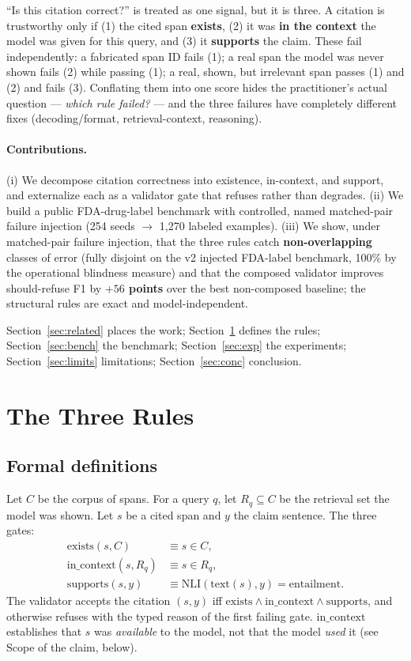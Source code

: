 ``Is this citation correct?'' is treated as one signal, but it is
three. A citation is trustworthy only if (1) the cited span
\textbf{exists}, (2) it was \textbf{in the context} the model was
given for this query, and (3) it \textbf{supports} the claim. These
fail independently: a fabricated span ID fails (1); a real span the
model was never shown fails (2) while passing (1); a real, shown, but
irrelevant span passes (1) and (2) and fails (3). Conflating them into
one score hides the practitioner's actual question --- \emph{which
rule failed?} --- and the three failures have completely different
fixes (decoding/format, retrieval-context, reasoning).

\paragraph{Contributions.}
(i) We decompose citation correctness into existence, in-context, and
support, and externalize each as a validator gate that refuses rather
than degrades. (ii) We build a public FDA-drug-label benchmark with
controlled, named matched-pair failure injection (254 seeds $\to$
1{,}270 labeled examples). (iii) We show, under matched-pair failure
injection, that the three rules catch \textbf{non-overlapping} classes
of error (fully disjoint on the v2 injected FDA-label benchmark, 100\%
by the operational blindness measure) and that the composed validator
improves should-refuse F1 by \textbf{$+56$ points} over the best
non-composed baseline; the structural rules are exact and
model-independent.

Section~\ref{sec:related} places the work; Section~\ref{sec:rules}
defines the rules; Section~\ref{sec:bench} the benchmark;
Section~\ref{sec:exp} the experiments; Section~\ref{sec:limits}
limitations; Section~\ref{sec:conc} conclusion.



\section{The Three Rules}
\label{sec:rules}

\subsection{Formal definitions}
\label{sec:rules-formal}

Let $C$ be the corpus of spans. For a query $q$, let $R_q \subseteq C$
be the retrieval set the model was shown. Let $s$ be a cited span and
$y$ the claim sentence. The three gates:
\begin{align*}
  \mathrm{exists}(s, C) &\equiv s \in C, \\
  \mathrm{in\_context}(s, R_q) &\equiv s \in R_q, \\
  \mathrm{supports}(s, y) &\equiv \mathrm{NLI}(\mathrm{text}(s), y) = \mathrm{entailment}.
\end{align*}
The validator accepts the citation $(s, y)$ iff
$\mathrm{exists} \land \mathrm{in\_context} \land \mathrm{supports}$,
and otherwise refuses with the typed reason of the first failing gate.
$\mathrm{in\_context}$ establishes that $s$ was \emph{available} to
the model, not that the model \emph{used} it (see Scope of the claim,
below).

